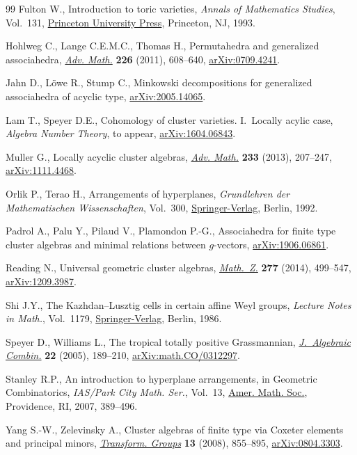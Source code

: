 \documentclass[pdftex]{sigma}%
\numberwithin{equation}{section}
\begin{document}
\begin{thebibliography}{99}
Fulton W., Introduction to toric varieties, \textit{Annals of Mathematics
 Studies}, Vol.~131, \href{https://doi.org/10.1515/9781400882526}{Princeton University Press}, Princeton, NJ, 1993.

Hohlweg C., Lange C.E.M.C., Thomas H., Permutahedra and generalized
 associahedra, \href{https://doi.org/10.1016/j.aim.2010.07.005}{\textit{Adv. Math.}} \textbf{226} (2011), 608--640,
 \href{https://arxiv.org/abs/0709.4241}{arXiv:0709.4241}.

Jahn D., L\"owe R., Stump C., Minkowski decompositions for generalized
 associahedra of acyclic type, \href{https://arxiv.org/abs/2005.14065}{arXiv:2005.14065}.

Lam T., Speyer D.E., Cohomology of cluster varieties. {I}.~{L}ocally acylic
 case, \textit{Algebra Number Theory}, {t}o appear, \href{https://arxiv.org/abs/1604.06843}{arXiv:1604.06843}.

Muller G., Locally acyclic cluster algebras, \href{https://doi.org/10.1016/j.aim.2012.10.002}{\textit{Adv. Math.}} \textbf{233}
 (2013), 207--247, \href{https://arxiv.org/abs/1111.4468}{arXiv:1111.4468}.

Orlik P., Terao H., Arrangements of hyperplanes, \textit{Grundlehren der
 Mathematischen Wissenschaften}, Vol.~300, \href{https://doi.org/10.1007/978-3-662-02772-1}{Springer-Verlag}, Berlin, 1992.

Padrol A., Palu Y., Pilaud V., Plamondon P.-G., Associahedra for finite type
 cluster algebras and minimal relations between $g$-vectors,
 \href{https://arxiv.org/abs/1906.06861}{arXiv:1906.06861}.

Reading N., Universal geometric cluster algebras, \href{https://doi.org/10.1007/s00209-013-1264-4}{\textit{Math.~Z.}}
 \textbf{277} (2014), 499--547, \href{https://arxiv.org/abs/1209.3987}{arXiv:1209.3987}.

Shi J.Y., The {K}azhdan--{L}usztig cells in certain affine {W}eyl groups,
 \textit{Lecture Notes in Math.}, Vol.~1179, \href{https://doi.org/10.1007/BFb0074968}{Springer-Verlag}, Berlin, 1986.

Speyer D., Williams L., The tropical totally positive {G}rassmannian,
 \href{https://doi.org/10.1007/s10801-005-2513-3}{\textit{J.~Algebraic Combin.}} \textbf{22} (2005), 189--210,
 \href{https://arxiv.org/abs/math.CO/0312297}{arXiv:math.CO/0312297}.

Stanley R.P., An introduction to hyperplane arrangements, in Geometric
 Combinatorics, \textit{IAS/Park City Math. Ser.}, Vol.~13, \href{https://doi.org/10.1090/pcms/013/08}{Amer. Math. Soc.},
 Providence, RI, 2007, 389--496.

Yang S.-W., Zelevinsky A., Cluster algebras of finite type via {C}oxeter
 elements and principal minors, \href{https://doi.org/10.1007/s00031-008-9025-x}{\textit{Transform. Groups}} \textbf{13} (2008),
 855--895, \href{https://arxiv.org/abs/0804.3303}{arXiv:0804.3303}.

\end{thebibliography}\LastPageEnding
\end{document}
